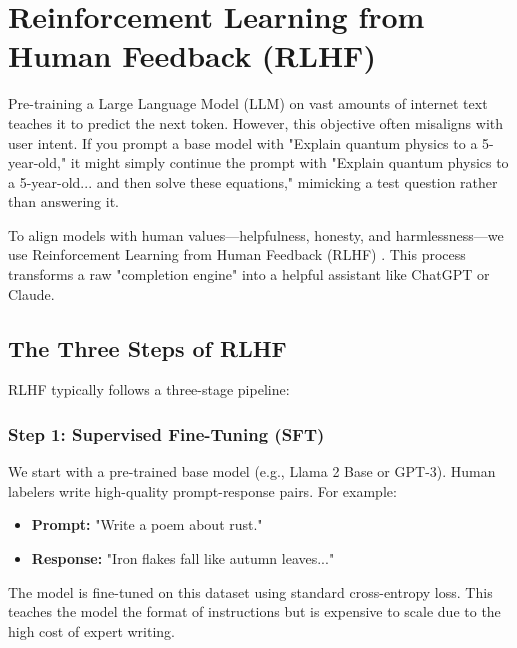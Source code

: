 \chapter{Reinforcement Learning from Human Feedback (RLHF)}
\label{chap:rlhf}

Pre-training a Large Language Model (LLM) on vast amounts of internet text teaches it to predict the next token. However, this objective often misaligns with user intent. If you prompt a base model with "Explain quantum physics to a 5-year-old," it might simply continue the prompt with "Explain quantum physics to a 5-year-old... and then solve these equations," mimicking a test question rather than answering it.

To align models with human values---helpfulness, honesty, and harmlessness---we use Reinforcement Learning from Human Feedback (RLHF) \cite{christiano2017deep, ouyang2022training}. This process transforms a raw "completion engine" into a helpful assistant like ChatGPT or Claude.

\section{The Three Steps of RLHF}

RLHF typically follows a three-stage pipeline:

\subsection{Step 1: Supervised Fine-Tuning (SFT)}
We start with a pre-trained base model (e.g., Llama 2 Base or GPT-3). Human labelers write high-quality prompt-response pairs. For example:
\begin{itemize}
    \item \textbf{Prompt:} "Write a poem about rust."
    \item \textbf{Response:} "Iron flakes fall like autumn leaves..."
\end{itemize}
The model is fine-tuned on this dataset using standard cross-entropy loss. This teaches the model the format of instructions but is expensive to scale due to the high cost of expert writing.

